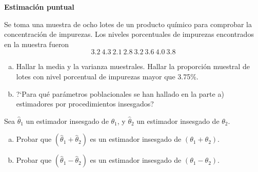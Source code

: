 \documentclass[12pt]{article}
\begin{document}
\newpage
\textbf{Estimación puntual}

\begin{prob}
    Se toma una muestra de ocho lotes de un producto químico para
    comprobar la concentración de impurezas. Los niveles porcentuales
    de impurezas encontrados en la muestra fueron
    $$3.2 \ 4.3 \ 2.1 \ 2.8\ 3.2 \ 3.6\ 4.0\ 3.8$$
    \begin{enumerate}[a)]
        \item Hallar la media y la varianza muestrales.
        Hallar la proporción muestral de lotes con nivel
        porcentual de impurezas mayor que 3.75\%.
        \item ?`Para qué parámetros poblacionales  se han hallado en la
        parte  a) estimadores por procedimientos insesgados?
        \end{enumerate}
\end{prob}
%
%

\begin{prob}
        Sea $\hat{\theta}_{1}$ un estimador insesgado de $\theta_{1}$, y
        $\hat{\theta}_{2}$ un estimador insesgado de $\theta_{2}$.
        \begin{enumerate}[a)]
            \item Probar que $(\hat{\theta}_{1}+\hat{\theta}_{2})$ es un
            estimador insesgado de $(\theta_{1}+\theta_{2})$.
            \item  Probar que $(\hat{\theta}_{1}-\hat{\theta}_{2})$ es un
            estimador insesgado de $(\theta_{1}-\theta_{2})$.
            \end{enumerate}
        \end{prob}
\end{document}
